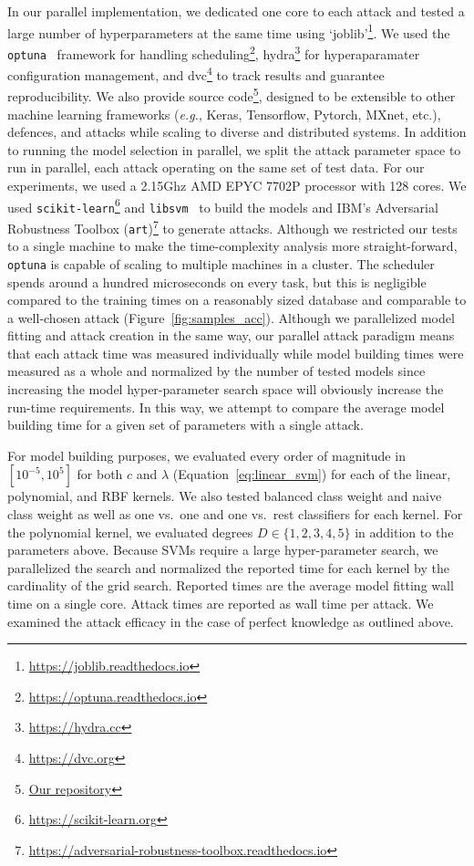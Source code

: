 \documentclass[fonts]{icst}
\begin{document}
In our parallel implementation, we dedicated one core to each attack and tested a large number of hyperparameters at the same time using `joblib'\footnote{\href{https://joblib.readthedocs.io}{https://joblib.readthedocs.io}}.
We used the \texttt{optuna}~\cite{optuna} framework for handling scheduling\footnote{\href{https://optuna.readthedocs.io}{https://optuna.readthedocs.io}}, hydra\footnote{\href{https://hydra.cc}{https://hydra.cc}} for hyperaparamater configuration management, and dvc\footnote{\href{https://dvc.org}{https://dvc.org}} to track results and guarantee reproducibility.
We also provide source code\footnote{\href{https://github.com/simplymathematics/deckard/}{Our repository}}, designed to be extensible to other machine learning frameworks (\textit{e.g.}, Keras, Tensorflow, Pytorch, MXnet, etc.), defences, and attacks while scaling to diverse and distributed systems.
In addition to running the model selection in parallel, we split the attack parameter space to run in parallel, each attack operating on the same set of test data.
For our experiments, we used a 2.15Ghz AMD EPYC 7702P processor with 128 cores.
We used \texttt{scikit-learn}\footnote{\href{https://scikit-learn.org/}{https://scikit-learn.org}} and \texttt{libsvm}~\cite{chang2011libsvm} to build the models and IBM's Adversarial Robustness Toolbox (\texttt{art})\footnote{\href{https://adversarial-robustness-toolbox.readthedocs.io/}{https://adversarial-robustness-toolbox.readthedocs.io}} to generate attacks.
Although we restricted our tests to a single machine to make the time-complexity analysis more straight-forward, \texttt{optuna} is capable of scaling to multiple machines in a cluster.
The scheduler spends around a hundred microseconds on every task, but this is negligible compared to the training times on a reasonably sized database and comparable to a well-chosen attack (Figure~\ref{fig:samples_acc}).
Although we parallelized model fitting and attack creation in the same way, our parallel attack paradigm means that each attack time was measured individually while model building times were measured as a whole and normalized by the number of tested models since increasing the model hyper-parameter search space will obviously increase the run-time requirements.
In this way, we attempt to compare the average model building time for a given set of parameters with a single attack.

For model building purposes, we evaluated every order of magnitude in $[10^{-5}, 10^5]$ for both $c$  and $\lambda$ (Equation~\ref{eq:linear_svm}) for each of the linear, polynomial, and RBF kernels.
We also tested balanced class weight and naive class weight as well as one vs.~one and one vs.~rest classifiers for each kernel.
For the polynomial kernel, we evaluated degrees $D\in\{1,2,3,4,5\}$ in addition to the parameters above.
Because SVMs require a large hyper-parameter search, we parallelized the search and normalized the reported time for each kernel by the cardinality of the grid search.
Reported times are the average model fitting  wall time on a single core.
Attack times are reported as wall time per attack.
We examined the attack efficacy in the case of perfect knowledge as outlined above.
\end{document}
